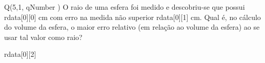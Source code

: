 \begin{numerical}[tolerance=0.001,points=5]{Q(5,1,{{ qNumber }})}
  O raio de uma esfera foi medido e descobriu-se que possui {{ rdata[0][0] }} cm
  com erro na medida não superior {{ rdata[0][1] }} cm. Qual é, no cálculo do
  volume da esfera, o maior erro relativo (em relação ao volume da esfera) ao se
  usar tal valor como raio?
\item {{ rdata[0][2] }}
\end{numerical}
